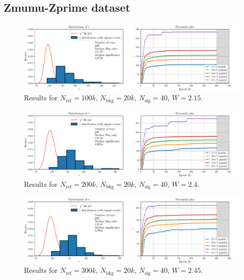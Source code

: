 \subsection*{Zmumu-Zprime dataset}
\vspace{-5mm}
\begin{figure}[H]
	\centering
	\includegraphics[width=1.0\textwidth]{Python/RESULTS/ref100000_bkg20000_sig40/data_ref100000_bkg20000_sig40_wclip2-15.pdf}
	\caption{Results for $N_\mathrm{ref}=100\si{k}$, $N_\mathrm{bkg}=20\si{k}$, $N_\mathrm{sig}=40$, $W=2.15$.}
	\label{fig:REF100000_BKG20000_SIG40_WCLIP2.15}
\end{figure}
\vspace{-5mm}
\begin{figure}[H]
	\centering
	\includegraphics[width=1.0\textwidth]{Python/RESULTS/ref200000_bkg20000_sig40/data_ref200000_bkg20000_sig40_wclip2-4.pdf}
	\caption{Results for $N_\mathrm{ref}=200\si{k}$, $N_\mathrm{bkg}=20\si{k}$, $N_\mathrm{sig}=40$, $W=2.4$.}
	\label{fig:REF200000_BKG20000_SIG40_WCLIP2.4}
\end{figure}
\vspace{-5mm}
\begin{figure}[H]
	\centering
	\includegraphics[width=1.0\textwidth]{Python/RESULTS/ref300000_bkg20000_sig40/data_ref300000_bkg20000_sig40_wclip2-45.pdf}
	\caption{Results for $N_\mathrm{ref}=300\si{k}$, $N_\mathrm{bkg}=20\si{k}$, $N_\mathrm{sig}=40$, $W=2.45$.}
	\label{fig:REF300000_BKG20000_SIG40_WCLIP2.45}
\end{figure}

